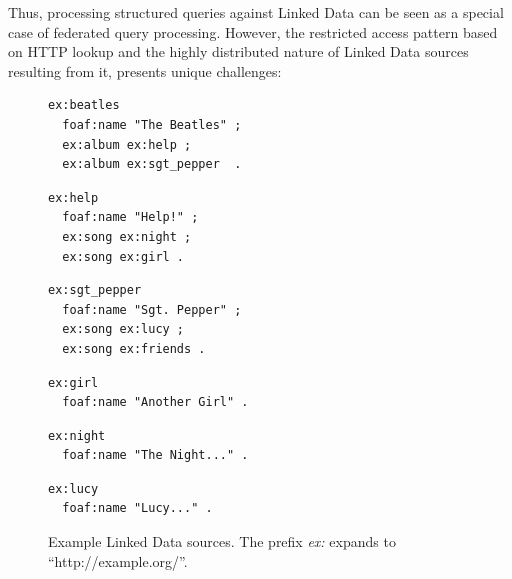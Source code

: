 Thus, processing structured queries against Linked Data can be seen as
a special case of federated query processing. However, the restricted
access pattern based on HTTP lookup and the highly distributed nature
of Linked Data sources resulting from it, presents unique challenges:

\begin{figure}[ht]
  \centering
  \begin{minipage}{0.32\linewidth}
\begin{lstlisting}[breaklines=true,language=ttl,linewidth=0.98\linewidth,frame=single,caption=http://example.org/beatles]
ex:beatles 
  foaf:name "The Beatles" ;
  ex:album ex:help ;
  ex:album ex:sgt_pepper  .
\end{lstlisting}
  \end{minipage}
  \begin{minipage}{0.32\linewidth}
\begin{lstlisting}[breaklines=true,language=ttl,linewidth=0.98\linewidth,frame=single,caption=http://example.org/help]
ex:help 
  foaf:name "Help!" ;
  ex:song ex:night ;
  ex:song ex:girl .
\end{lstlisting}
  \end{minipage}
  \begin{minipage}{0.32\linewidth}
\begin{lstlisting}[breaklines=true,language=ttl,linewidth=0.98\linewidth,frame=single,caption=http://example.org/sgt\_pepper]
ex:sgt_pepper
  foaf:name "Sgt. Pepper" ;
  ex:song ex:lucy ;
  ex:song ex:friends .
\end{lstlisting}
  \end{minipage}
  \begin{minipage}{0.32\linewidth}
\begin{lstlisting}[breaklines=false,language=ttl,frame=single,linewidth=0.98\linewidth,caption=http://example.org/girl]
ex:girl
  foaf:name "Another Girl" .

\end{lstlisting}
  \label{fig:example}
  \end{minipage}
  \begin{minipage}{0.32\linewidth}
\begin{lstlisting}[breaklines=true,language=ttl,frame=single,linewidth=0.98\linewidth,showlines=true,caption=http://example.org/night]
ex:night 
  foaf:name "The Night..." .
\end{lstlisting}
  \end{minipage}
  \begin{minipage}{0.32\linewidth}
\begin{lstlisting}[breaklines=true,language=ttl,frame=single,showlines=true,caption=http://example.org/lucy]
ex:lucy
  foaf:name "Lucy..." .
\end{lstlisting}
  \end{minipage}

  \caption{Example Linked Data sources. The prefix \emph{ex:} expands
    to ``http://example.org/''.}
  \label{fig:sources}
\end{figure}

